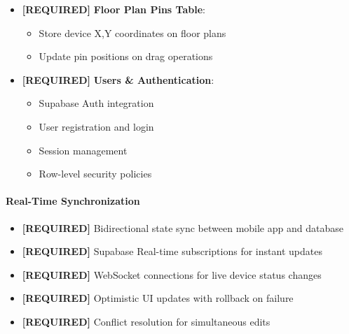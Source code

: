 \documentclass[12pt,a4paper]{article}
\begin{document}
\begin{itemize}[leftmargin=*]
\begin{itemize}
        \item Safety timeout schedule configuration
        \item Enable/disable schedule operations
        \item Associate schedules with devices
    \end{itemize}
    \item \textcolor{required}{\textbf{[REQUIRED]}} \textbf{Floor Plan Pins Table}:
    \begin{itemize}
        \item Store device X,Y coordinates on floor plans
        \item Update pin positions on drag operations
    \end{itemize}
    \item \textcolor{required}{\textbf{[REQUIRED]}} \textbf{Users \& Authentication}:
    \begin{itemize}
        \item Supabase Auth integration
        \item User registration and login
        \item Session management
        \item Row-level security policies
    \end{itemize}
\end{itemize}


\paragraph{Real-Time Synchronization}
\begin{itemize}[leftmargin=*]
    \item \textcolor{required}{\textbf{[REQUIRED]}} Bidirectional state sync between mobile app and database
    \item \textcolor{required}{\textbf{[REQUIRED]}} Supabase Real-time subscriptions for instant updates
    \item \textcolor{required}{\textbf{[REQUIRED]}} WebSocket connections for live device status changes
    \item \textcolor{required}{\textbf{[REQUIRED]}} Optimistic UI updates with rollback on failure
    \item \textcolor{required}{\textbf{[REQUIRED]}} Conflict resolution for simultaneous edits
\end{itemize}
\end{document}

